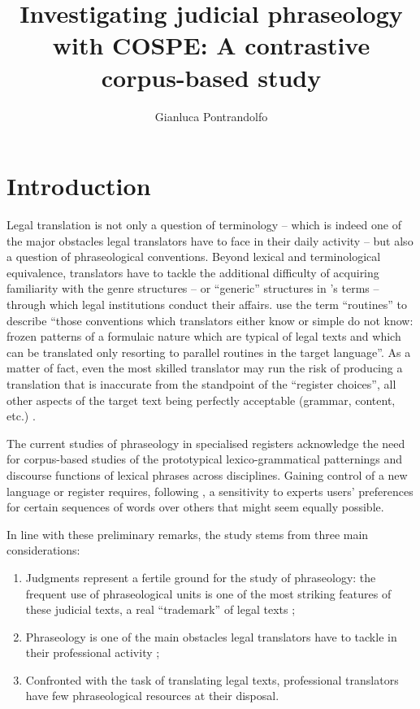 \documentclass[output=paper]{LSP/langsci}
\author{Gianluca Pontrandolfo}
\title{Investigating judicial phraseology with COSPE: A contrastive corpus-based study}
\begin{document}
\section{Introduction}
 Legal translation is not only a question of terminology – which is indeed one of the major obstacles legal translators have to face in their daily activity – but also a question of phraseological conventions. Beyond lexical and terminological equivalence, translators have to tackle the additional difficulty of acquiring familiarity with the genre structures – or “generic” structures in \citeauthor{Hasan1978}'s \citeyear{Hasan1978} terms – through which legal institutions conduct their affairs. \citet[190]{Hatim1990} use the term “routines” to describe “those conventions which translators either know or simple do not know: frozen patterns of a formulaic nature which are typical of legal texts and which can be translated only resorting to parallel routines in the target language”. As a matter of fact, even the most skilled translator may run the risk of producing a translation that is inaccurate from the standpoint of the “register choices”, all other aspects of the target text being perfectly acceptable (grammar, content, etc.) \citep[see][218-219]{Garzone2007}.
 
The current studies of phraseology in specialised registers acknowledge the need for corpus-based studies of the prototypical lexico-grammatical patternings and discourse functions of lexical phrases across disciplines. Gaining control of a new language or register requires, following \citet[5]{Hyland2008}, a sensitivity to experts users’ preferences for certain sequences of words over others that might seem equally possible.
 
In line with these preliminary remarks, the study stems from three main considerations:

\begin{enumerate}
\item Judgments represent a fertile ground for the study of phraseology: the frequent use of phraseological units is one of the most striking features of these judicial texts, a real “trademark” of legal texts \citep[154]{Mortara2001};
\item Phraseology is one of the main obstacles legal translators have to tackle in their professional activity \citep[see][]{Garzone2007,Kjaer2007};
\item Confronted with the task of translating legal texts, professional translators have few phraseological resources at their disposal.
\end{enumerate}
\end{document}
